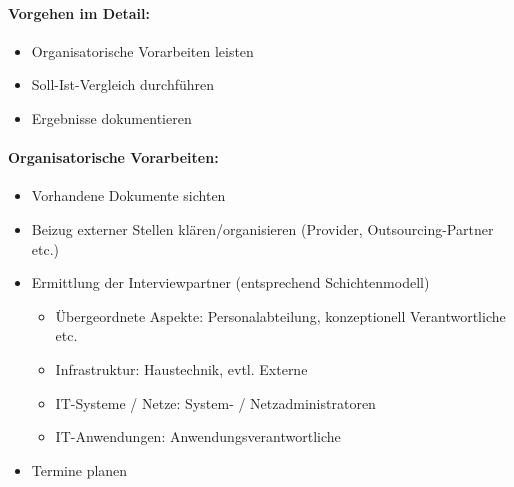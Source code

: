 \documentclass[10pt,a4paper]{article}
\begin{document}
\paragraph*{Vorgehen im Detail:}
\begin{itemize}[noitemsep,topsep=0pt,leftmargin=*]
    \item Organisatorische Vorarbeiten leisten
    \item Soll-Ist-Vergleich durchführen
    \item Ergebnisse dokumentieren
\end{itemize}

\paragraph*{Organisatorische Vorarbeiten:}
\begin{itemize}[noitemsep,topsep=0pt,leftmargin=*]
    \item Vorhandene Dokumente sichten
    \item Beizug externer Stellen klären/organisieren (Provider,
    Outsourcing-Partner etc.)
    \item Ermittlung der Interviewpartner (entsprechend
    Schichtenmodell)
    \begin{itemize}[noitemsep,topsep=0pt,leftmargin=*]
        \item Übergeordnete Aspekte: Personalabteilung,
        konzeptionell Verantwortliche etc.
        \item Infrastruktur: Haustechnik, evtl. Externe
        \item IT-Systeme / Netze: System- / Netzadministratoren
        \item IT-Anwendungen: Anwendungsverantwortliche
    \end{itemize}
    \item Termine planen
\end{itemize}
\end{document}
